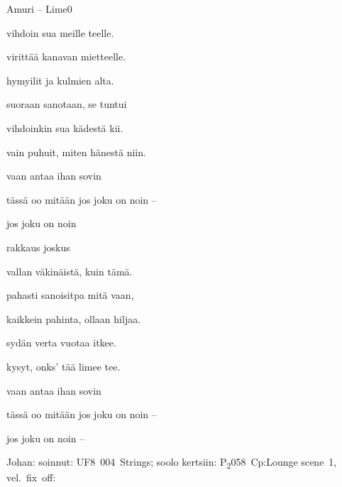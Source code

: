 \documentclass[11pt,a4paper]{article}
\begin{document}
\thispagestyle{empty}
\begin{mysong}{Amuri – Lime}{0}


\begin{SBVerse}
   vihdoin  sua meille teelle.

   virittää kanavan  mietteelle.

   hymyilit ja  kulmien alta.

   suoraan sanotaan, se tuntui 

   vihdoinkin  sua kädestä kii.

   vain puhuit, miten  hänestä niin.
\end{SBVerse}

\begin{SBChorus}
   vaan antaa   ihan
  sovin

   tässä oo mitään  jos joku  on
   noin  --
  
  jos joku  on  noin 
\end{SBChorus}

\begin{SBVerse}
   rakkaus joskus 

   vallan väkinäistä,  kuin tämä.

   pahasti  sanoisitpa mitä vaan,

   kaikkein pahinta,  ollaan hiljaa.

   sydän verta vuotaa  itkee.

   kysyt, onks' tää limee  tee.
\end{SBVerse}

\begin{SBChorus}
   vaan antaa   ihan
  sovin

   tässä oo mitään  jos joku  on
   noin  --
  
  jos joku  on  noin  --
\end{SBChorus}


{\SBLyricNoteFont Johan: soinnut: UF8~004~Strings; soolo kertsiin:
P\textsubscript{2}058~Cp:Lounge scene~1, vel.~fix~off:}


\end{mysong}
\end{document}
